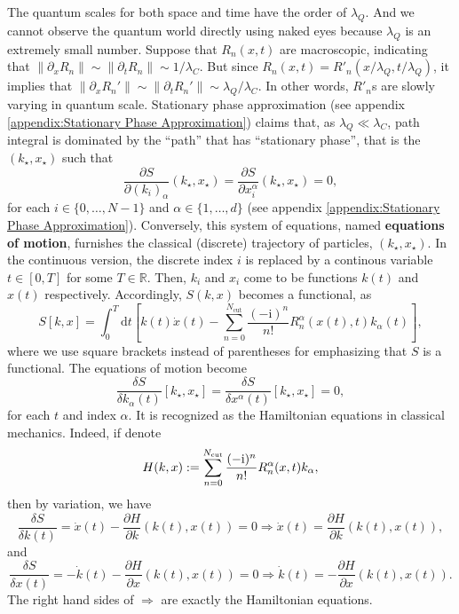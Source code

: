 \documentclass{book}
\newcommand{\assign}{:=}
\newcommand{\mathd}{\mathrm{d}}
\newcommand{\mathi}{\mathrm{i}}
\newcommand{\tmop}[1]{\ensuremath{\operatorname{#1}}}
\newcommand{\tmstrong}[1]{\textbf{#1}}
\begin{document}
The quantum scales for both space and time have the order of $\lambda_Q$. And
we cannot observe the quantum world directly using naked eyes because
$\lambda_Q$ is an extremely small number. Suppose that $R_n  (x, t)$ are
macroscopic, indicating that $\| \partial_x R_n \| \sim \| \partial_t R_n \|
\sim 1 / \lambda_C$. But since $R_n  (x, t) = R'_n  (x / \lambda_Q, t /
\lambda_Q)$, it implies that $\| \partial_x R_n' \| \sim \| \partial_t R_n' \|
\sim \lambda_Q / \lambda_C$. In other words, $R'_n$s are slowly varying in
quantum scale. Stationary phase approximation (see appendix
\ref{appendix:Stationary Phase Approximation}) claims that, as $\lambda_Q \ll
\lambda_C$, path integral is dominated by the ``path'' that has ``stationary
phase'', that is the $(k_{\star}, x_{\star})$ such that
\[ \frac{\partial S}{\partial (k_i)_{\alpha}}  (k_{\star}, x_{\star}) =
   \frac{\partial S}{\partial x_i^{\alpha}}  (k_{\star}, x_{\star}) = 0, \]
for each $i \in \{0, \ldots, N - 1\}$ and $\alpha \in \{1, \ldots, d\}$ (see
appendix \ref{appendix:Stationary Phase Approximation}). Conversely, this
system of equations, named {\tmstrong{equations of motion}}, furnishes the
classical (discrete) trajectory of particles, $(k_{\star}, x_{\star})$. In the
continuous version, the discrete index $i$ is replaced by a continous variable
$t \in [0, T]$ for some $T \in \mathbb{R}$. Then, $k_i$ and $x_i$ come to be
functions $k (t)$ and $x (t)$ respectively. Accordingly, $S (k, x)$ becomes a
functional, as
\[ S [k, x] = \int_0^T \mathd t \left[ k (t) \dot{x} (t) - \sum_{n =
   0}^{N_{\tmop{cut}}} \frac{(- \mathi)^n}{n!} R^{\alpha}_n (x (t), t)
   k_{\alpha} (t) \right], \]
where we use square brackets instead of parentheses for emphasizing that $S$
is a functional. The equations of motion become
\[ \frac{\delta S}{\delta k_{\alpha} (t)}  [k_{\star}, x_{\star}] =
   \frac{\delta S}{\delta x^{\alpha} (t)}  [k_{\star}, x_{\star}] = 0, \]
for each $t$ and index $\alpha$. It is recognized as the Hamiltonian equations
in classical mechanics. Indeed, if denote
\[ H (k, x) \assign \sum_{n = 0}^{N_{\tmop{cut}}} \frac{(- \mathi)^n}{n!}
   {\color[HTML]{000000}R^{\alpha}_n  (x, t)} k_{\alpha}, \]
then by variation, we have
\[ \frac{\delta S}{\delta k (t)} = \dot{x} (t) - \frac{\partial H}{\partial k}
   (k (t), x (t)) = 0 \Rightarrow \dot{x} (t) = \frac{\partial H}{\partial k}
   (k (t), x (t)), \]
and
\[ \frac{\delta S}{\delta x (t)} = - \dot{k} (t) - \frac{\partial H}{\partial
   x}  (k (t), x (t)) = 0 \Rightarrow \dot{k} (t) = - \frac{\partial
   H}{\partial x}  (k (t), x (t)) . \]
The right hand sides of $\Rightarrow$ are exactly the Hamiltonian equations.
\end{document}
